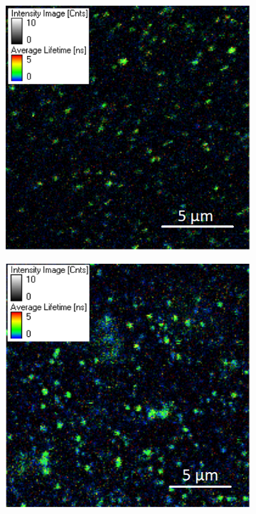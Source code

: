 \documentclass[twoside,single]{lion-msc}
\begin{document}
\begin{figure}
\begin{subfigure}{.5\textwidth}
  \centering
  \includegraphics[width=.95 \linewidth]{onetooneratio}
  \label{}
\end{subfigure}%
\begin{subfigure}{.5\textwidth}
  \centering
  \includegraphics[width=.95 \linewidth]{onetofive}

\end{subfigure}
\end{figure}
\end{document}
